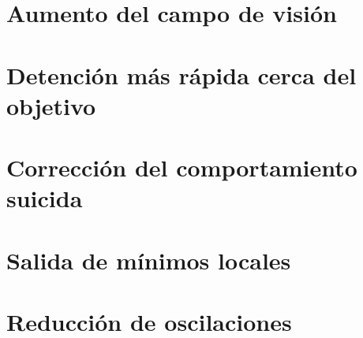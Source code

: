 \documentclass[a4paper, 11pt, titlepage]{article}
\begin{document}
  \maketitle
  \tableofcontents
  \newpage

  \section{Aumento del campo de visión}
  

  \section{Detención más rápida cerca del objetivo}

  \section{Corrección del comportamiento suicida}

  \section{Salida de mínimos locales}

  \section{Reducción de oscilaciones}
\end{document}
